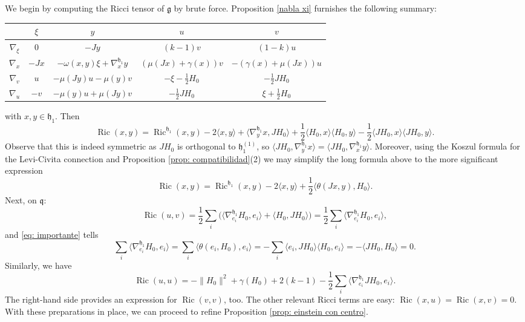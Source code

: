 \documentclass[12pt, twoside]{amsart}
\def\g{\mathfrak{g}}
\def\h{\mathfrak{h}}
\def\q{\mathfrak{q}}
\def\ric{\operatorname{Ric}}
\theoremstyle{definition}
\begin{document}
We begin by computing the Ricci tensor of $\g$ by brute force. 
Proposition \ref{nabla xi} furnishes the following summary:
\begin{longtable}[c]{c | c c c c} 
{} & $\xi$ & $y$ & $u$ & $v$\\ \midrule
$\nabla_{\xi}$ & $0$ & $-Jy$ & $(k-1)v$ & $(1-k)u$\\[1mm] 
$\nabla_{x}$ & $-Jx$ & $-\omega(x,y)\xi +\nabla_{x}^{\h_1}y$ & $(\mu(Jx)+\gamma(x))v$ & $-(\gamma(x)+ \mu(Jx) )u$ \\[1mm] 
$\nabla_{v}$ & $u$ & $-\mu(Jy)u-\mu(y)v$ & $-\xi-\tfrac{1}{2}H_0$ & 
$-\tfrac{1}{2}JH_0$\\[1mm] 
$\nabla_{u}$ & $-v$ & $-\mu(y)u+\mu(Jy)v$ & $-\tfrac{1}{2}JH_0$ & 
$\xi + \tfrac{1}{2}H_0$\\ \midrule
\end{longtable}
with $x,y \in \h_1$. 
Then 
\begin{equation*}
    \ric (x,y)=\ric^{\h_1}(x,y)-2\langle x,y\rangle+
    \langle \nabla_{y}^{\h_1}x, JH_0 \rangle +\frac{1}{2}\langle H_0,x\rangle \langle H_0,y\rangle  -\frac{1}{2} \langle JH_0,x \rangle \langle JH_0 , y \rangle.
\end{equation*}
Observe that this is indeed symmetric as $JH_0$ is orthogonal to $\h_1^{(1)}$, so $ \langle JH_0, \nabla^{\h_1}_{y}x\rangle = \langle JH_0 , \nabla ^{\h_1}_{x}y\rangle$. Moreover, using the Koszul formula for the Levi-Civita connection and Proposition \ref{prop: compatibilidad}(2) we may simplify the long formula above to the more significant expression
\begin{equation} \label{Ric en h1}
    \ric (x,y)=\ric^{\h_1}(x,y)-2\langle x,y\rangle+ \frac{1}{2}\langle \theta (Jx, y),H_0 \rangle. 
\end{equation} 
Next, on ${\q}$:
\[ \ric (u,v)= \frac{1}{2} {\textstyle\sum}_i \big(\langle \nabla ^{\h_1}_{e_i}H_0, e_i \rangle + \langle H_0 , JH_0 \rangle\big)= 
\frac{1}{2} {\textstyle\sum}_i \langle \nabla ^{\h_1}_{e_i}H_0, e_i \rangle, \]
and \eqref{eq: importante} tells 
$$
   {\textstyle\sum}_i \langle \nabla ^{\h_1}_{e_i}H_0,e_i \rangle ={\textstyle\sum}_i \langle \theta(e_i,H_0), e_i \rangle 
   =-{\textstyle\sum}_i\langle e_i , JH_0 \rangle \langle H_0 , e_i \rangle 
   =-\langle JH_0,H_0\rangle =0.
$$
Similarly, we have 
\begin{equation}\label{Ric en u,u} 
    \ric (u, u) = -\| H_0 \|^{2} +\gamma(H_0) +2(k-1) - \frac{1}{2} {\textstyle\sum}_i \langle\nabla ^{\h_1}_{e_i} JH_0 , e_i \rangle.
\end{equation} 
The right-hand side provides an expression for $\ric (v, v)$, too. 
The other relevant Ricci terms are easy: $ \ric (x, u)=\ric (x, v)=0$. 
\smallbreak
With these preparations in place, we can proceed to refine Proposition \ref{prop: einstein con centro}.
\end{document}
